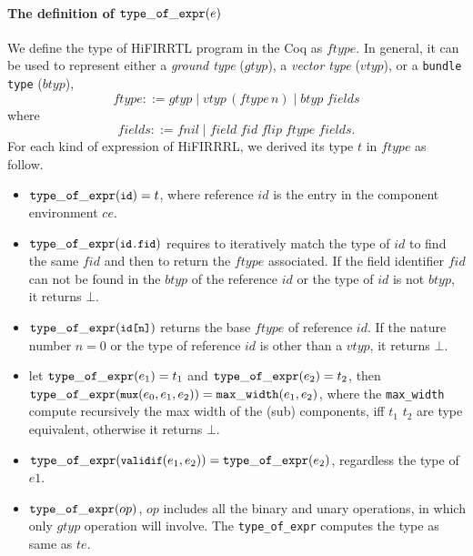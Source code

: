 \paragraph*{The definition of ${\tt type\_of\_expr}(e)$ }%
We define the type of HiFIRRTL program in the Coq as $ftype$. In general, it can be used to represent either a {\it ground type} ($gtyp$), a {\it vector type} ($vtyp$), or a {\tt bundle type} ($btyp$),
$$ftype::=gtyp\;|\;vtyp\,(ftype\,n)\;|\;btyp\;fields$$
where $$fields::=fnil\;|\;field\;fid\;flip\;ftype\;fields.$$
For each kind of expression of HiFIRRRL, we derived its type $t$ in $ftype$ as follow.
\begin{itemize}
\item ${\tt type\_of\_expr}(\mbox{\prettyll{id}})=t$, where reference $id$ is the entry in the component environment $ce$.
\item ${\tt type\_of\_expr}(\mbox{\prettyll{id.fid}})$ requires to iteratively match the type of $id$ to find the same $fid$ and then to return the $ftype$ associated. If the field identifier $fid$ can not be found in the $btyp$ of the reference $id$ or the type of $id$ is not $btyp$, it returns $\bot$.
\item ${\tt type\_of\_expr}(\mbox{\prettyll{id[n]}})$ returns the base $ftype$ of reference $id$. If the nature number $n=0$ or the type of reference $id$ is other than a $vtyp$, it returns $\bot$.
\item let ${\tt type\_of\_expr}(e_1)=t_1$ and ${\tt type\_of\_expr}(e_2)=t_2$, then ${\tt type\_of\_expr}(\mbox{\prettyll{mux}}(e_0,e_1,e_2))={\tt max\_width}(e_1,e_2)$, where the {\tt max\_width} compute recursively the max width of the (sub) components, iff $t_1$ $t_2$ are type equivalent, otherwise it returns $\bot$.
\item ${\tt type\_of\_expr}(\mbox{\prettyll{validif}}(e_1,e_2))={\tt type\_of\_expr}(e_2)$, regardless the type of $e1$.
\item ${\tt type\_of\_expr}(op)$, $op$ includes all the binary and unary operations, in which only $gtyp$ operation will involve. The {\tt type\_of\_expr} computes the type as same as $te$.
\end{itemize}


